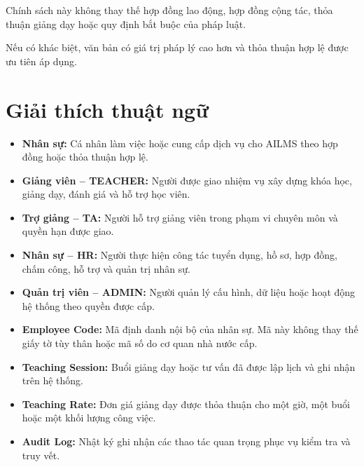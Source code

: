 \documentclass[12pt,a4paper]{article}
\begin{document}
Chính sách này không thay thế hợp đồng lao động, hợp đồng cộng tác,
thỏa thuận giảng dạy hoặc quy định bắt buộc của pháp luật.

Nếu có khác biệt, văn bản có giá trị pháp lý cao hơn và thỏa thuận hợp lệ
được ưu tiên áp dụng.

\section{Giải thích thuật ngữ}

\begin{itemize}
    \item \textbf{Nhân sự:} Cá nhân làm việc hoặc cung cấp dịch vụ cho AILMS
    theo hợp đồng hoặc thỏa thuận hợp lệ.

    \item \textbf{Giảng viên -- TEACHER:} Người được giao nhiệm vụ
    xây dựng khóa học, giảng dạy, đánh giá và hỗ trợ học viên.

    \item \textbf{Trợ giảng -- TA:} Người hỗ trợ giảng viên trong phạm vi
    chuyên môn và quyền hạn được giao.

    \item \textbf{Nhân sự -- HR:} Người thực hiện công tác tuyển dụng,
    hồ sơ, hợp đồng, chấm công, hỗ trợ và quản trị nhân sự.

    \item \textbf{Quản trị viên -- ADMIN:} Người quản lý cấu hình,
    dữ liệu hoặc hoạt động hệ thống theo quyền được cấp.

    \item \textbf{Employee Code:} Mã định danh nội bộ của nhân sự.
    Mã này không thay thế giấy tờ tùy thân hoặc mã số do cơ quan nhà nước cấp.

    \item \textbf{Teaching Session:} Buổi giảng dạy hoặc tư vấn
    đã được lập lịch và ghi nhận trên hệ thống.

    \item \textbf{Teaching Rate:} Đơn giá giảng dạy được thỏa thuận
    cho một giờ, một buổi hoặc một khối lượng công việc.

    \item \textbf{Audit Log:} Nhật ký ghi nhận các thao tác quan trọng
    phục vụ kiểm tra và truy vết.
\end{itemize}

\end{document}
